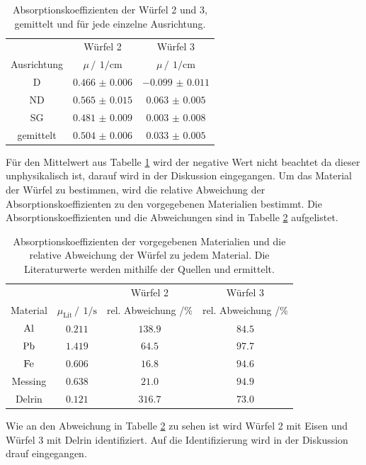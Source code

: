 \begin{table}
    \centering
    \caption{Absorptionskoeffizienten der Würfel 2 und 3, gemittelt und für jede einzelne Ausrichtung.}
    \label{tab:Absorptionskoeffizienten_1_2}
    \begin{tabular}{c c c}
        \toprule
        &Würfel 2&Würfel 3\\
        \cmidrule(lr){2-2}\cmidrule(lr){3-3}
        Ausrichtung&$\mu \,/\,\SI{}{1\per\centi\meter}$&$\mu \,/\,\SI{}{1\per\centi\meter}$\\
        \midrule
        D &$\num{0.466(6)}$&$\num{-0.099(11)}$\\
        ND&$\num{0.565(15)}$&$\num{0.063(5)}$\\
        SG&$\num{0.481(9)}$&$\num{0.003(8)}$\\
        \midrule
        gemittelt&$\num{0.504(6)}$&$\num{0.033(5)}$\\
        \bottomrule
    \end{tabular}
\end{table}
\FloatBarrier
Für den Mittelwert aus Tabelle \ref{tab:Absorptionskoeffizienten_1_2} wird der negative Wert nicht beachtet da dieser unphysikalisch ist,
darauf wird in der Diskussion eingegangen. Um das Material der Würfel zu bestimmen, wird die relative Abweichung der Absorptionskoeffizienten zu 
den vorgegebenen Materialien bestimmt. Die Absorptionskoeffizienten und die Abweichungen sind in Tabelle \ref{tab:Abweichung23}
aufgelistet.
\FloatBarrier
\begin{table}
    \centering
    \caption{Absorptionskoeffizienten der vorgegebenen Materialien und die relative Abweichung der Würfel zu jedem Material. Die 
    Literaturwerte werden mithilfe der Quellen \cite{Massenkoef} und \cite{Dichte} ermittelt.}
    \label{tab:Abweichung23}
    \begin{tabular}{c c c c}
        \toprule
        &&Würfel 2& Würfel 3\\
        \cmidrule(lr){3-3}\cmidrule(lr){4-4}
        Material&$\mu_{\text{Lit}}\,/\,\SI{}{1\per\second}$&rel. Abweichung /\%&rel. Abweichung /\%\\
        \midrule
        $\ce{Al}$&$\num{0.211}$&$\num{138.9}$&$\num{84.5}$\\
        $\ce{Pb}$&$\num{1.419}$&$\num{64.5}$&$\num{97.7}$\\
        $\ce{Fe}$&$\num{0.606}$&$\num{16.8}$&$\num{94.6}$\\
        Messing  &$\num{0.638}$&$\num{21.0}$&$\num{94.9}$\\ 
        Delrin   &$\num{0.121}$&$\num{316.7}$&$\num{73.0}$\\
        \bottomrule
    \end{tabular}
\end{table}
\FloatBarrier
Wie an den Abweichung in Tabelle \ref{tab:Abweichung23} zu sehen ist wird Würfel 2 mit Eisen und Würfel 3 mit Delrin identifiziert. Auf die 
Identifizierung wird in der Diskussion drauf eingegangen.
